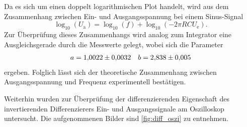 Da es sich um einen doppelt logarithmischen Plot handelt, wird aus dem Zusammenhang zwischen Ein- und Ausgangsspannung bei einem Sinus-Signal
\begin{equation*}
  \log_{10} (U_\mathrm{a}) = \log_{10} (f) + \log_{10} (- 2 \pi R C U_\mathrm{e}).
\end{equation*}
Zur Überprüfung dieses Zusammenhangs wird analog zum Integrator eine Ausgleichsgerade durch die Messwerte gelegt, wobei sich die Parameter
\begin{align*}
  a = \num{1.0022 \pm 0.0032} && b = \num{2.838 \pm 0.005}
\end{align*}
ergeben. Folglich lässt sich der theoretische Zusammenhang zwischen Ausgangsspannung und Frequenz experimentell bestätigen.

Weiterhin wurden zur Überprüfung der differenzierenden Eigenschaft des invertierenden Differenzierers Ein- und Ausgangssignale am Oszilloskop untersucht. Die aufgenommenen Bilder sind \autoref{fig:diff_oszi} zu entnehmen.


